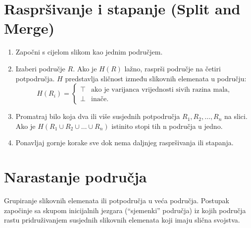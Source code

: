 \documentclass[11pt,english]{article}
\begin{document}
\section{Raspršivanje i stapanje (Split and Merge)}
\begin{enumerate}
  \item Započni s cijelom slikom kao jednim područjem.
  \item Izaberi područje $R$. Ako je $H(R)$ lažno, rasprši područje na četiri potpodručja. $H$ predstavlja sličnost između slikovnih elemenata u području:
  $$H(R_i) = \left \{ \begin{array}{ll}
  \top & \text{ako je varijanca vrijednosti sivih razina mala},\\
  \bot & \text{inače}.
  \end{array}\right .$$
  \item Promatraj bilo koja dva ili više susjednih potpodručja $R_1, R_2, \ldots, R_n$ na slici. Ako je $H(R_1 \cup R_2 \cup \ldots \cup R_n)$ istinito stopi tih n područja u jedno.
  \item Ponavljaj gornje korake sve dok nema daljnjeg raspršivanja ili stapanja.
\end{enumerate}

\section{Narastanje područja}
Grupiranje slikovnih elemenata ili potpodručja u veća područja. Postupak započinje sa skupom inicijalnih jezgara (``sjemenki'' područja) iz kojih područja rastu pridruživanjem susjednih slikovnih elemenata koji imaju slična svojstva.
\end{document}
